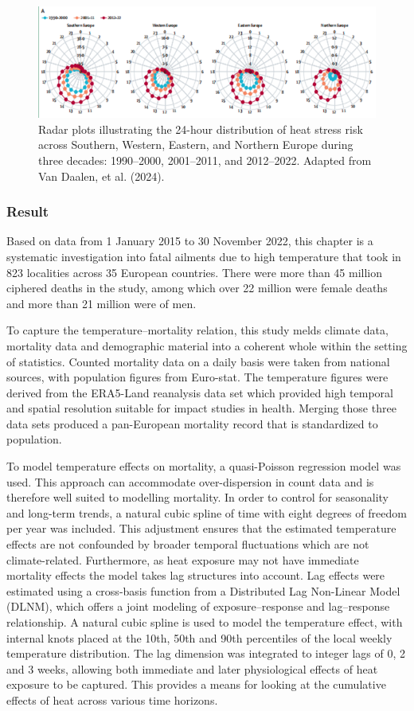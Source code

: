 \documentclass[
]{krantz}
\begin{document}
\begin{figure}
\includegraphics[width=1\linewidth]{0} \caption{Radar plots illustrating the 24-hour distribution of heat stress risk across Southern, Western, Eastern, and Northern Europe during three decades: 1990–2000, 2001–2011, and 2012–2022. Adapted from Van Daalen, et al. (2024).}\label{fig:radarplot}
\end{figure}

\subsubsection{Result}\label{result}

Based on data from 1 January 2015 to 30 November 2022, this chapter is a systematic investigation into fatal ailments due to high temperature that took in 823 localities across 35 European countries. There were more than 45 million ciphered deaths in the study, among which over 22 million were female deaths and more than 21 million were of men.

To capture the temperature--mortality relation, this study melds climate data, mortality data and demographic material into a coherent whole within the setting of statistics. Counted mortality data on a daily basis were taken from national sources, with population figures from Euro-stat. The temperature figures were derived from the ERA5-Land reanalysis data set which provided high temporal and spatial resolution suitable for impact studies in health. Merging those three data sets produced a pan-European mortality record that is standardized to population.

To model temperature effects on mortality, a quasi-Poisson regression model was used. This approach can accommodate over-dispersion in count data and is therefore well suited to modelling mortality. In order to control for seasonality and long-term trends, a natural cubic spline of time with eight degrees of freedom per year was included. This adjustment ensures that the estimated temperature effects are not confounded by broader temporal fluctuations which are not climate-related. Furthermore, as heat exposure may not have immediate mortality effects the model takes lag structures into account. Lag effects were estimated using a cross-basis function from a Distributed Lag Non-Linear Model (DLNM), which offers a joint modeling of exposure--response and lag--response relationship. A natural cubic spline is used to model the temperature effect, with internal knots placed at the 10th, 50th and 90th percentiles of the local weekly temperature distribution. The lag dimension was integrated to integer lags of 0, 2 and 3 weeks, allowing both immediate and later physiological effects of heat exposure to be captured. This provides a means for looking at the cumulative effects of heat across various time horizons.
\end{document}
